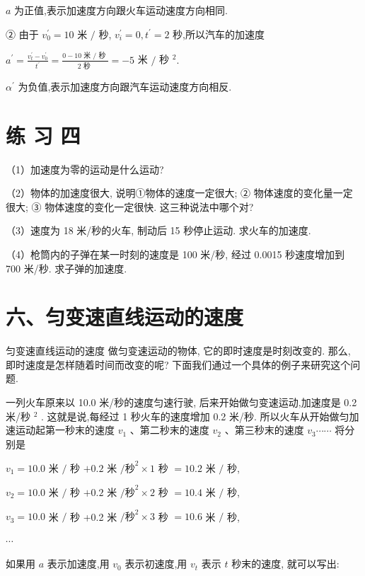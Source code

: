 \documentclass[10pt]{article}
\begin{document}
\(a\) 为正值,表示加速度方向跟火车运动速度方向相同.

② 由于 \({v}_{0}^{\prime } = {10}\) 米 \(/\) 秒, \({v}_{i}^{\prime } = 0,{t}^{\prime } = 2\) 秒,所以汽车的加速度

\({a}^{\prime } = \frac{{v}_{t}^{\prime } - {v}_{0}^{\prime }}{{t}^{\prime }} = \frac{0 - {10}\text{ 米 }/\text{ 秒 }}{2\text{ 秒 }} = - 5\) 米 \(/\) 秒 \({}^{2}.\)

\({\alpha }^{\prime }\) 为负值,表示加速度方向跟汽车运动速度方向相反.

\section*{练 习 四}

（1）加速度为零的运动是什么运动?

（2）物体的加速度很大, 说明①物体的速度一定很大; ② 物体速度的变化量一定很大; ③ 物体速度的变化一定很快. 这三种说法中哪个对?

（3）速度为 18 米/秒的火车, 制动后 15 秒停止运动. 求火车的加速度.

（4）枪筒内的子弹在某一时刻的速度是 100 米/秒, 经过 0.0015 秒速度增加到 700 米/秒. 求子弹的加速度.

\section*{六、匀变速直线运动的速度}

匀变速直线运动的速度 做匀变速运动的物体, 它的即时速度是时刻改变的. 那么, 即时速度是怎样随着时间而改变的呢? 下面我们通过一个具体的例子来研究这个问题.

一列火车原来以 10.0 米/秒的速度匀速行驶, 后来开始做匀变速运动,加速度是 0.2 米/秒 \({}^{2}\) . 这就是说,每经过 1 秒火车的速度增加 0.2 米/秒. 所以火车从开始做匀加速运动起第一秒末的速度 \({v}_{1}\) 、第二秒末的速度 \({v}_{2}\) 、第三秒末的速度 \({v}_{3}\cdots \cdots\) 将分别是

\({v}_{1} = {10.0}\) 米 \(/\) 秒 \(+ {0.2}\) 米 \(/{\text{秒}}^{2} \times 1\) 秒 \(= {10.2}\) 米 \(/\) 秒,

\({v}_{2} = {10.0}\) 米 \(/\) 秒 \(+ {0.2}\) 米 \(/{\text{秒}}^{2} \times 2\) 秒 \(= {10.4}\) 米 \(/\) 秒,

\({v}_{3} = {10.0}\) 米 \(/\) 秒 +0.2 米 \(/{\text{秒}}^{2} \times 3\) 秒 \(= {10.6}\) 米 \(/\) 秒,

\(\cdots\)

如果用 \(a\) 表示加速度,用 \({v}_{0}\) 表示初速度,用 \({v}_{t}\) 表示 \(t\) 秒末的速度, 就可以写出:
\end{document}
